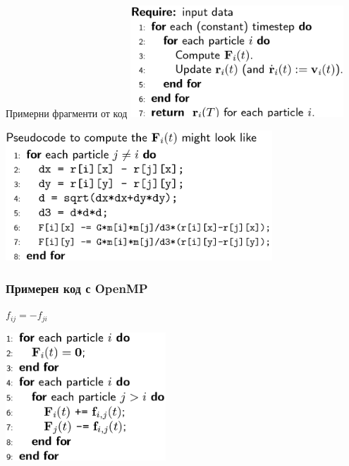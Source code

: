 \documentclass{beamer}
\begin{document}
\begin{frame}{Примерни фрагменти от код}
  \includegraphics[width=0.6\textwidth]{pseudo-code}\pause
  
  \includegraphics[width=0.75\textwidth]{pseudo-code-c}
\end{frame}

\begin{frame}
  \frametitle{Примерен код с OpenMP}
  $f_{ij} = -f_{ji}$

  \includegraphics[width=0.45\textwidth]{pseudo-code1}
\end{frame}
\end{document}
